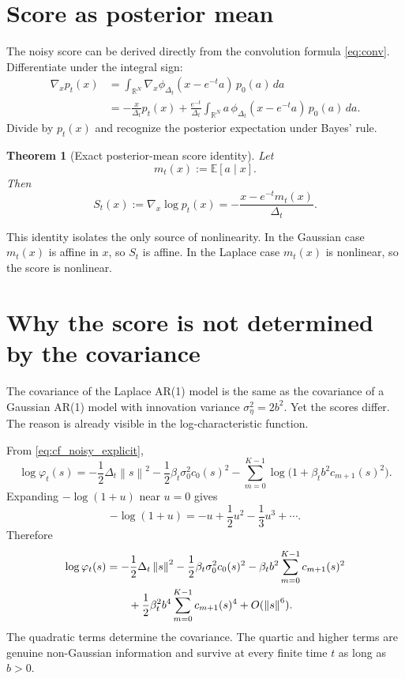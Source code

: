 \documentclass[11pt]{article}
\newtheorem{theorem}[proposition]{Theorem}
\newcommand{\R}{\mathbb{R}}
\newcommand{\E}{\mathbb{E}}
\newcommand{\norm}[1]{\left\lVert #1 \right\rVert}
\begin{document}
\section{Score as posterior mean}
The noisy score can be derived directly from the convolution formula \eqref{eq:conv}. Differentiate under the integral sign:
\begin{align*}
\nabla_x p_t(x)
&=
\int_{\R^N}\nabla_x\phi_{\Delta_t}(x-e^{-t}a)\,p_0(a)\,da \\
&=
-\frac{x}{\Delta_t}p_t(x)
+
\frac{e^{-t}}{\Delta_t}
\int_{\R^N}a\,\phi_{\Delta_t}(x-e^{-t}a)\,p_0(a)\,da.
\end{align*}
Divide by $p_t(x)$ and recognize the posterior expectation under Bayes' rule.
\begin{theorem}[Exact posterior-mean score identity]\label{thm:score_posterior}
Let
\begin{equation}\label{eq:posterior_mean}
 m_t(x):=\E[a\mid x].
\end{equation}
Then
\begin{equation}\label{eq:score_posterior}
S_t(x):=\nabla_x\log p_t(x)
=
-\frac{x-e^{-t}m_t(x)}{\Delta_t}.
\end{equation}
\end{theorem}

This identity isolates the only source of nonlinearity. In the Gaussian case $m_t(x)$ is affine in $x$, so $S_t$ is affine. In the Laplace case $m_t(x)$ is nonlinear, so the score is nonlinear.

\section{Why the score is not determined by the covariance}
The covariance of the Laplace AR(1) model is the same as the covariance of a Gaussian AR(1) model with innovation variance $\sigma_\eta^2=2b^2$. Yet the scores differ. The reason is already visible in the log-characteristic function.

From \eqref{eq:cf_noisy_explicit},
\begin{equation}\label{eq:log_cf}
\log\varphi_t(s)
=
-\frac12\Delta_t\norm{s}^2
-\frac12\beta_t\sigma_0^2 c_0(s)^2
-\sum_{m=0}^{K-1}\log\bigl(1+\beta_t b^2 c_{m+1}(s)^2\bigr).
\end{equation}
Expanding $-\log(1+u)$ near $u=0$ gives
\[
-\log(1+u)=-u+\frac12u^2-\frac13u^3+\cdots.
\]
Therefore
\begin{align}
\log\varphi_t(s)
&=
-\frac12\Delta_t\norm{s}^2
-\frac12\beta_t\sigma_0^2 c_0(s)^2
-\beta_t b^2\sum_{m=0}^{K-1}c_{m+1}(s)^2 \notag\\
&\qquad +\frac12\beta_t^2 b^4\sum_{m=0}^{K-1}c_{m+1}(s)^4
+O(\norm{s}^6).
\label{eq:quartic}
\end{align}
The quadratic terms determine the covariance. The quartic and higher terms are genuine non-Gaussian information and survive at every finite time $t$ as long as $b>0$.
\end{document}
